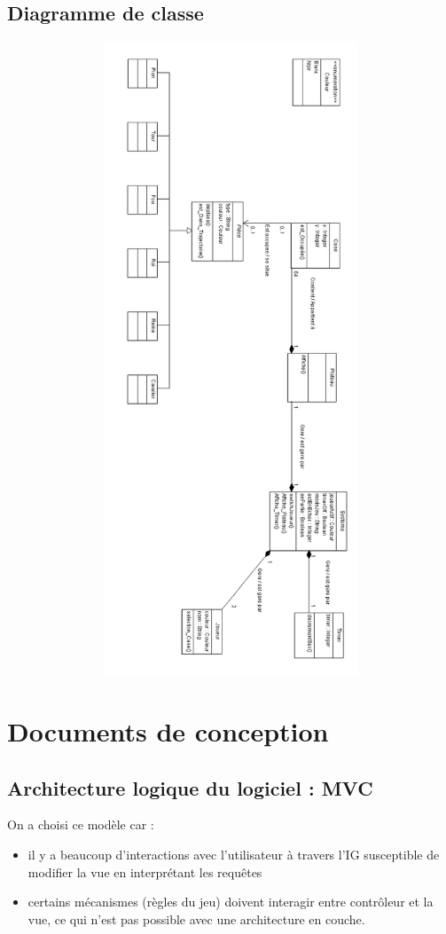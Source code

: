 \documentclass[11pt,a4paper]{report}
\begin{document}
\section*{Diagramme de classe}
\begin{figure}[ht]
\begin{center}
  \includegraphics[width = 35em, height=51em]{images/classe/Diagrammedeclasses.png}
\end{center}
\end{figure}

\chapter*{Documents de conception}
\section*{Architecture logique du logiciel : MVC}
On a choisi ce modèle car :
\begin{itemize}
    \item il y a beaucoup d'interactions avec l’utilisateur à travers l’IG susceptible de modifier la vue en
  interprétant les requêtes
    \item certains mécanismes (règles du jeu) doivent interagir entre contrôleur et la vue, ce qui n’est pas possible avec une architecture en couche.
\end{itemize}
\maketitle
\end{document}
